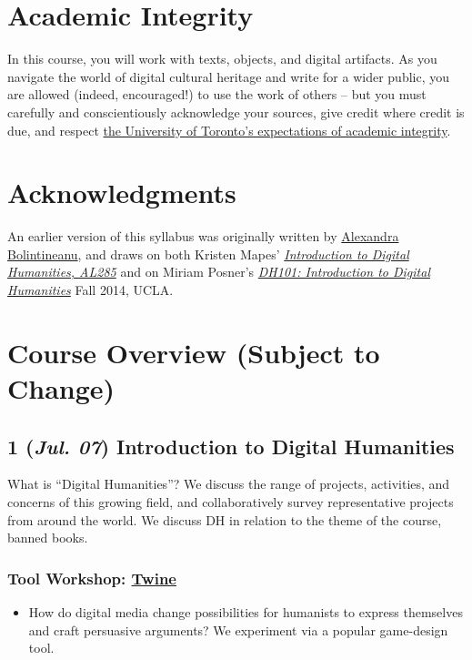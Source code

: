 \documentclass[11pt]{article}
\begin{document}
\section*{Academic Integrity}
\label{sec:org6ca8b97}
In this course, you will work with texts, objects, and digital artifacts. As you navigate the world of digital cultural heritage and write for a wider public, you are allowed (indeed, encouraged!) to use the work of others -- but you must carefully and conscientiously acknowledge your sources, give credit where credit is due, and respect \href{http://www.artsci.utoronto.ca/osai/The-rules/what-is-academic-misconduc}{the University of Toronto's expectations of academic integrity}.

\section*{Acknowledgments}
\label{sec:orgf0782cc}
An earlier version of this syllabus was originally written by \href{https://alexandrabolintineanu.wordpress.com/}{Alexandra Bolintineanu}, and draws on both Kristen Mapes' \emph{\href{http://dx.doi.org/10.17613/M6H34B}{Introduction to Digital Humanities, AL285}} and on Miriam Posner's \emph{\href{http://dh101.humanities.ucla.edu/}{DH101: Introduction to Digital Humanities}} Fall 2014, UCLA.

\section*{Course Overview (Subject to Change)}
\label{sec:org5d4d2e6}
\subsection*{1 (\textit{Jul. 07}) Introduction to Digital Humanities}
\label{sec:orge936ff5}
What is “Digital Humanities”? We discuss the range of projects, activities, and concerns of this growing field, and collaboratively survey representative projects from around the world. We discuss DH in relation to the theme of the course, banned books. 

\subsubsection*{Tool Workshop: \href{https://twinery.org/}{Twine}}
\label{sec:org9d40a1a}
\begin{itemize}
\item How do digital media change possibilities for humanists to express themselves and craft persuasive arguments? We experiment via a popular game-design tool.
\end{itemize}
\end{document}
